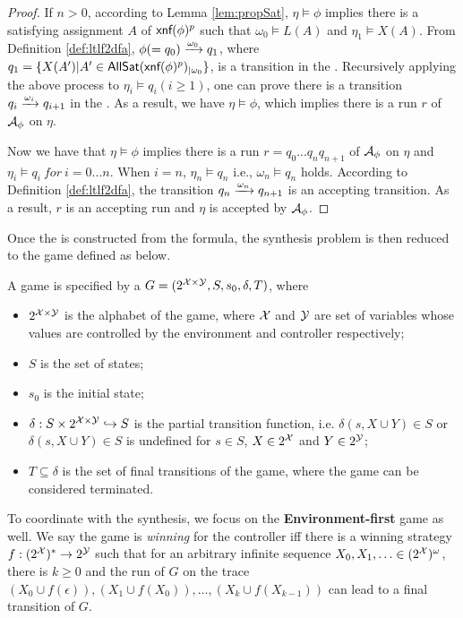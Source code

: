 \begin{proof}
If $n>0$, according to Lemma \ref{lem:propSat}, $\eta\models\phi$ implies there is a satisfying assignment $A$ of $\textsf{xnf}(\phi)^p$ such that $\omega_0\models L(A)$ and $\eta_1\models X(A)$. From Definition \ref{def:ltlf2dfa}, $\phi (=q_0)\xrightarrow[]{\omega_0}q_1$, where $q_1=\{X(A') | A'\in{\sf AllSat}(\textsf{xnf}(\phi)^p)_{|\omega_0}\}$, is a transition in the \TDFA. Recursively applying the above process to $\eta_i\models q_i(i\geq 1)$, one can prove there is a transition $q_i\xrightarrow[]{\omega_i}q_{i+1}$ in the \TDFA. As a result, we have $\eta\models\phi$, which implies there is a run $r$ of ${\mathcal{A}_{\phi}}$ on $\eta$.  

Now we have that $\eta\models\phi$ implies there is a run $r=q_0...q_n q_{n+1}$ of ${\mathcal{A}_{\phi}}$ on $\eta$ and $\eta_i\models q_i\ for\ i=0...n$. When $i=n$, $\eta_n\models q_n$ i.e., $\omega_n\models q_n$ holds. According to Definition \ref{def:ltlf2dfa}, the transition $q_n\xrightarrow[]{\omega_n}q_{n+1}$ is an accepting transition. As a result, $r$ is an accepting run and $\eta$ is accepted by ${\mathcal{A}_{\phi}}$.
\end{proof}


Once the \tdfa is constructed from the \ltlf formula, the synthesis problem is then reduced to the \tdfa game defined as below.

\begin{definition}\label{tdfa-game}
	A \tdfa game is specified by a \tdfa $G = (2^{\mathcal{X}\times\mathcal{Y}}, S, s_0, \delta, T)$, where 
	\begin{itemize}
		\item $2^{\mathcal{X}\times\mathcal{Y}}$ is the alphabet of the game, where $\mathcal{X}$ and $\mathcal{Y}$ are set of variables whose values are controlled by the environment and controller respectively;
		\item $S$ is the set of states;
		\item $s_0$ is the initial state;
		\item $\delta:S\times 2^{\mathcal{X}\times\mathcal{Y}}\hookrightarrow S$ is the partial transition function, i.e. $\delta (s, X\cup Y)\in S$ or $\delta (s, X\cup Y)\in S$ is undefined for $s\in S$, $X\in 2^{\mathcal{X}}$ and $Y\in 2^{\mathcal{Y}}$;
    \item $T \subseteq \delta$ is the set of final transitions of the game, where the game can be considered terminated.
	\end{itemize}
\end{definition}
To coordinate with the \ltlf synthesis, we focus on the \textbf{Environment-first} \tdfa game as well. We say the game is \emph{winning} for the controller iff there is a winning strategy $f: (2^{\mathcal{X}})^*\rightarrow 2^{\mathcal{Y}}$ such that for an arbitrary infinite sequence $X_0,X_1,\ldots\in (2^{\mathcal{X}})^{\omega}$, there is $k\geq 0$ and the run of $G$ on the trace $(X_0\cup f(\epsilon)), (X_1\cup f(X_0)),\ldots, (X_k\cup f(X_{k-1}))$ can lead to a final transition of $G$.

